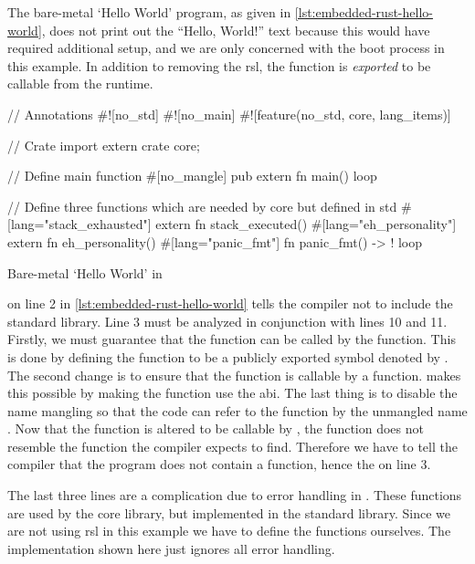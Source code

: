 The bare-metal `Hello World' program, as given in \autoref{lst:embedded-rust-hello-world}, does not print out the ``Hello, World!'' text because this would have required additional setup, and we are only concerned with the boot process in this example.
In addition to removing the \gls{rsl}, the {\main} function is \emph{exported} to be callable from the {\C} runtime.

\begin{listing}[H]
  \begin{rustcode}
// Annotations
#![no_std]
#![no_main]
#![feature(no_std, core, lang_items)]

// Crate import
extern crate core;

// Define main function
#[no_mangle]
pub extern fn main() {
  loop {}
}

// Define three functions which are needed by core but defined in std
#[lang="stack_exhausted"] extern fn stack_executed() {}
#[lang="eh_personality"] extern fn eh_personality() {}
#[lang="panic_fmt"] fn panic_fmt() -> ! { loop {} }
\end{rustcode}
\caption{Bare-metal `Hello World' in {\rust}}
\label{lst:embedded-rust-hello-world}
\end{listing}

\attrib{\#\![no\_std]} on line 2 in \autoref{lst:embedded-rust-hello-world} tells the {\rust} compiler not to include the standard library.
Line 3 must be analyzed in conjunction with lines 10 and 11.
Firstly, we must guarantee that the function can be called by the  function.
This is done by defining the {\main} function to be a publicly exported symbol denoted by .
The second change is to ensure that the function is callable by a {\C} function.
 makes this possible by making the function use the {\C} \gls{abi}.
The last thing is to disable the {\rust} name mangling so that the {\C} code can refer to the function by the unmangled name {\main}.
Now that the {\main} function is altered to be callable by {\C}, the function does not resemble the function the {\rust} compiler expects to find.
Therefore we have to tell the compiler that the program does not contain a {\main} function, hence the \attrib{\#\![no\_main]} on line 3.

The last three lines are a complication due to error handling in {\rust}.
These functions are used by the core library, but implemented in the standard library.
Since we are not using \gls{rsl} in this example we have to define the functions ourselves.
The implementation shown here just ignores all error handling.

